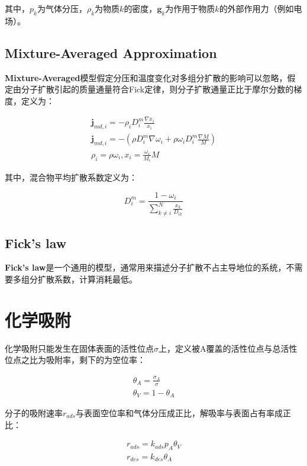 其中，$p_k$为气体分压，$\rho_k$为物质$k$的密度，$\bm{g}_k$为作用于物质$k$的外部作用力（例如电场）。

\subsection{Mixture-Averaged Approximation}
\textbf{Mixture-Averaged}模型假定分压和温度变化对多组分扩散的影响可以忽略，假定由分子扩散引起的质量通量符合Fick定律，则分子扩散通量正比于摩尔分数的梯度，定义为：

\begin{gather}
    \bm{j}_{md,i} = -\rho_i D_i^m \frac{\nabla x_i}{x_i} \\
    \bm{j}_{md,i} = -\left( \rho D_i^m \nabla \omega_i + \rho \omega_i D_i^m \frac{\nabla M}{M} \right) \\
    \rho_i = \rho\omega_i, x_i = \frac{\omega_i}{M_i} M
\end{gather}

其中，混合物平均扩散系数定义为：

\begin{equation}
    D_i^m = \frac{1-\omega_i}{\sum_{k\neq i}^N \frac{x_k}{D_{ik}}}
\end{equation}

\subsection{Fick's law}
\textbf{Fick's law}是一个通用的模型，通常用来描述分子扩散不占主导地位的系统，不需要多组分扩散系数，计算消耗最低。

\section{化学吸附}
化学吸附只能发生在固体表面的活性位点$ \sigma $上，定义被A覆盖的活性位点与总活性位点之比为吸附率，剩下的为空位率：

\begin{gather}
    \theta_A = \frac{\sigma_A}{\sigma} \\
    \theta_V = 1-\theta_A
\end{gather}

分子的吸附速率$ r_{ads} $与表面空位率和气体分压成正比，解吸率与表面占有率成正比：

\begin{gather}
    r_{ads} = k_{ads}p_A\theta_V \\
    r_{des} = k_{des}\theta_A
\end{gather}

